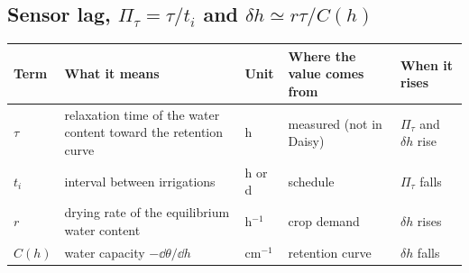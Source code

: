 \subsection*{Sensor lag, $\Pi_\tau=\tau/t_i$ and $\delta h\simeq r\tau/C(h)$}
{\small\begin{longtable}{>{\raggedright\arraybackslash}p{}>{\raggedright\arraybackslash}p{}>{\raggedright\arraybackslash}p{}>{\raggedright\arraybackslash}p{}>{\raggedright\arraybackslash}p{}}\toprule Term & What it means & Unit & Where the value comes from & When it rises\\\midrule\endhead
$\tau$ & relaxation time of the water content toward the retention curve & h & measured (not in Daisy) & $\Pi_\tau$ and $\delta h$ rise\\
$t_i$ & interval between irrigations & h or d & schedule & $\Pi_\tau$ falls\\
$r$ & drying rate of the equilibrium water content & h$^{-1}$ & crop demand & $\delta h$ rises\\
$C(h)$ & water capacity $-\dd\theta/\dd h$ & cm$^{-1}$ & retention curve & $\delta h$ falls\\
\bottomrule\end{longtable}}
